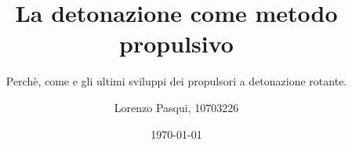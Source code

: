 \newcommand{\twominisw}[4]{\begin{figure}[H]
                \centering
		\begin{minipage}{#3\linewidth}
			#1
		\end{minipage}
		\begin{minipage}{#4\linewidth}
			#2
		\end{minipage}
              \end{figure}}
\documentclass{beamer}
\graphicspath{{../figures/}}
\usepackage[utf8]{inputenc}
\title{La detonazione come metodo propulsivo}
\subtitle{Perchè, come e gli ultimi sviluppi dei propulsori a detonazione rotante.}
\author{Lorenzo Pasqui, 10703226}
\date{\today}



